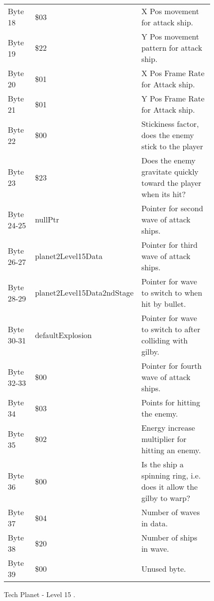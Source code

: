 \begin{figure}[H]
{\begin{adjustbox}{width=12cm}
\begin{tabular}{lll}
 Byte 18    & \$03                        & X Pos movement for attack ship.                                     \\
 Byte 19    & \$22                        & Y Pos movement pattern for attack ship.                             \\
 Byte 20    & \$01                        & X Pos Frame Rate for Attack ship.                                   \\
 Byte 21    & \$01                        & Y Pos Frame Rate for Attack ship.                                   \\
 Byte 22    & \$00                        & Stickiness factor, does the enemy stick to the player               \\
 Byte 23    & \$23                        & Does the enemy gravitate quickly toward the player when its hit?    \\
 Byte 24-25 & nullPtr                    & Pointer for second wave of attack ships.                            \\
 Byte 26-27 & planet2Level15Data         & Pointer for third wave of attack ships.                             \\
 Byte 28-29 & planet2Level15Data2ndStage & Pointer for wave to switch to when hit by bullet.                   \\
 Byte 30-31 & defaultExplosion           & Pointer for  wave to switch to after colliding with gilby.          \\
 Byte 32-33 & \$00                        & Pointer for fourth wave of attack ships.                            \\
 Byte 34    & \$03                        & Points for hitting the enemy.                                       \\
 Byte 35    & \$02                        & Energy increase multiplier for hitting an enemy.                    \\
 Byte 36    & \$00                        & Is the ship a spinning ring, i.e. does it allow the gilby to warp?  \\
 Byte 37    & \$04                        & Number of waves in data.                                            \\
 Byte 38    & \$20                        & Number of ships in wave.                                            \\
 Byte 39    & \$00                        & Unused byte.                                                        \\
\bottomrule
\end{tabular}

  \end{adjustbox}

  }\caption*{Tech Planet - Level 15
.}
\end{figure}

